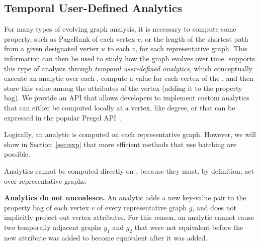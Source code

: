 \subsection{Temporal User-Defined Analytics}
\label{sec:analytics}

For many types of evolving graph analysis, it is necessary to compute
some property, such as PageRank of each vertex $v$, or the length of
the shortest path from a given designated vertex $u$ to each $v$, for
each representative graph.  This information can then be used to study
how the graph evolves over time.  \ql supports this type of analysis
through {\em temporal user-defined analytics}, which conceptually
execute an analytic over each \rg, compute a value for each vertex of
the \rg, and then store this value among the attributes of the vertex
(adding it to the property bag).  We provide an API that allows
developers to implement custom analytics that can either be computed
locally at a vertex, like degree, or that can be expressed in the
popular Pregel API~\cite{DBLP:conf/sigmod/MalewiczABDHLC10}.

Logically, an analytic is computed on each representative graph.
However, we will show in Section~\ref{sec:exp} that more efficient
methods that use batching are possible.


Analytics cannot be computed directly on \tve, because they must, by
definition, act over representative graphs.

{\bf Analytics do not uncoalesce.} An analytic adds a new key-value
pair to the property bag of each vertex $v$ of every representative
graph $g$, and does not implicitly project out vertex attributes.  For
this reason, an analytic cannot cause two temporally adjacent graphs
$g_1$ and $g_2$ that were not equivalent before the new attribute was
added to become equivalent after it was added.




